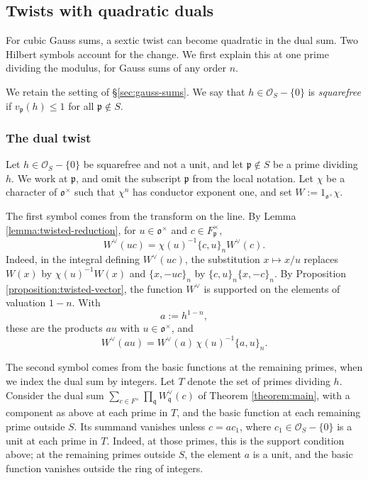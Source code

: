 \documentclass[reqno]{amsart}
\theoremstyle{plain}
\theoremstyle{definition}
\theoremstyle{itplain}
\numberwithin{equation}{section}
\numberwithin{theorem}{section}
\begin{document}
\subsection{Twists with quadratic duals}\label{sec:quadratic-dual}
For cubic Gauss sums, a sextic twist can become quadratic in the dual sum.  Two Hilbert symbols account for the change.  We first explain this at one prime dividing the modulus, for Gauss sums of any order $n$.

We retain the setting of \S\ref{sec:gauss-sums}.  We say that $h \in \mathcal{O}_S - \{0\}$ is \emph{squarefree} if $v_{\mathfrak{p}}(h) \leq 1$ for all $\mathfrak{p} \notin S$.

\subsubsection{The dual twist}\label{sec:two-symbols}
Let $h \in \mathcal{O}_S - \{0\}$ be squarefree and not a unit, and let $\mathfrak{p} \notin S$ be a prime dividing $h$.  We work at $\mathfrak{p}$, and omit the subscript $\mathfrak{p}$ from the local notation.  Let $\chi$ be a character of $\mathfrak{o}^\times$ such that $\chi^n$ has conductor exponent one, and set $W := 1_{\mathfrak{o}^\times} \chi$.

The first symbol comes from the transform on the line.  By Lemma \ref{lemma:twisted-reduction}, for $u \in \mathfrak{o}^\times$ and $c \in F_{\mathfrak{p}}^\times$,
\begin{equation*}
  W^\vee(u c) = \chi(u)^{-1} \{c, u\}_n W^\vee(c).
\end{equation*}
Indeed, in the integral defining $W^\vee(u c)$, the substitution $x \mapsto x / u$ replaces $W(x)$ by $\chi(u)^{-1} W(x)$ and $\{x, - u c\}_n$ by $\{c, u\}_n \{x, -c\}_n$.  By Proposition \ref{proposition:twisted-vector}, the function $W^\vee$ is supported on the elements of valuation $1 - n$.  With
\begin{equation*}
  a := h^{1-n},
\end{equation*}
these are the products $a u$ with $u \in \mathfrak{o}^\times$, and
\begin{equation}\label{eq:first-symbol}
  W^\vee(a u) = W^\vee(a) \, \chi(u)^{-1} \{a, u\}_n.
\end{equation}

The second symbol comes from the basic functions at the remaining primes, when we index the dual sum by integers.  Let $T$ denote the set of primes dividing $h$.  Consider the dual sum $\sum_{c \in F^\times} \prod_{\mathfrak{q}} W_{\mathfrak{q}}^\vee(c)$ of Theorem \ref{theorem:main}, with a component as above at each prime in $T$, and the basic function at each remaining prime outside $S$.  Its summand vanishes unless $c = a c_1$, where $c_1 \in \mathcal{O}_S - \{0\}$ is a unit at each prime in $T$.  Indeed, at those primes, this is the support condition above; at the remaining primes outside $S$, the element $a$ is a unit, and the basic function vanishes outside the ring of integers.
\end{document}
